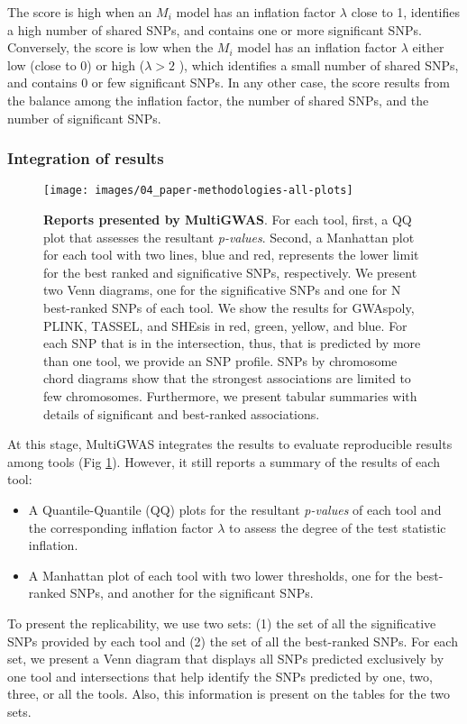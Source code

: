 \documentclass{article}
\begin{document}
The score is high when an $M_{i}$ model has an inflation factor $\lambda$ close to 1, identifies a high number of shared SNPs, and contains one or more significant SNPs. Conversely, the score is low when the $M_{i}$ model has an inflation factor $\lambda$ either low (close to 0) or high ($\lambda>2$ ), which identifies a small number of shared SNPs, and contains 0 or few significant SNPs. In any other case, the score results from the balance among the inflation factor, the number of shared SNPs, and the number of significant SNPs.


\subsubsection{Integration of results}

\begin{figure}
\texttt{[image: images/04\_paper-methodologies-all-plots]} \caption{\textbf{Reports presented by MultiGWAS}. For each tool, first, a QQ plot that assesses the resultant \emph{p-values}. Second, a Manhattan plot for each tool with two lines, blue and red, represents the lower limit for the best ranked and significative SNPs, respectively. We present two Venn diagrams, one for the significative SNPs and one for N best-ranked SNPs of each tool. We show the results for GWAspoly, PLINK, TASSEL, and SHEsis in red, green, yellow, and blue. For each SNP that is in the intersection, thus, that is predicted by more than one tool, we provide an SNP profile. SNPs by chromosome chord diagrams show that the strongest associations are limited to few chromosomes. Furthermore, we present tabular summaries with details of significant and best-ranked associations.\label{fig: Reports} }
\end{figure}
At this stage, MultiGWAS integrates the results to evaluate reproducible results among tools (Fig \ref{fig: Reports}). However, it still reports a summary of the results of each tool: 
\begin{itemize}
\item A Quantile-Quantile (QQ) plots for the resultant \emph{p-values} of each tool and the corresponding inflation factor $\lambda$ to assess the degree of the test statistic inflation. 
\item A Manhattan plot of each tool with two lower thresholds, one for the best-ranked SNPs, and another for the significant SNPs. 
\end{itemize}
To present the replicability, we use two sets: (1) the set of all the significative SNPs provided by each tool and (2) the set of all the best-ranked SNPs. For each set, we present a Venn diagram that displays all SNPs predicted exclusively by one tool and intersections that help identify the SNPs predicted by one, two, three, or all the tools. Also, this information is present on the tables for the two sets.
\end{document}
